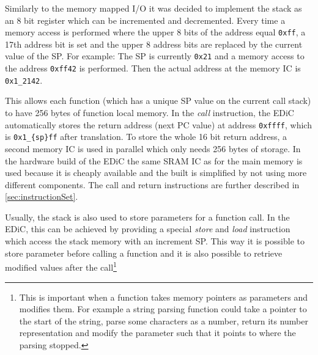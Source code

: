 Similarly to the memory mapped I/O it was decided to implement the stack as an 8 bit register which can be incremented and decremented.
Every time a memory access is performed where the upper 8 bits of the address equal \texttt{0xff}, a 17th address bit is set and the upper 8 address bits are replaced by the current value of the \gls{SP}.
For example: The \gls{SP}  is currently \texttt{0x21} and a memory access to the address \texttt{0xff42} is performed.
Then the actual address at the memory \gls{IC} is \texttt{0x1\_2142}.

This allows each function (which has a unique \gls{SP} value on the current call stack) to have 256 bytes of function local memory.
In the \emph{call} instruction, the \gls{EDiC} automatically stores the return address (next \gls{PC} value) at address \texttt{0xffff}, which is \texttt{0x1\_\{sp\}ff} after translation.
To store the whole 16 bit return address, a second memory \gls{IC} is used in parallel which only needs 256 bytes of storage.
In the hardware build of the \gls{EDiC} the same \gls{SRAM} \gls{IC} as for the main memory is used because it is cheaply available and the built is simplified by not using more different components.
The call and return instructions are further described in \cref{sec:instructionSet}.

Usually, the stack is also used to store parameters for a function call.
In the \gls{EDiC}, this can be achieved by providing a special \emph{store} and \emph{load} instruction which access the stack memory with an increment \gls{SP}.
This way it is possible to store parameter before calling a function and it is also possible to retrieve modified values after the call\footnote{This is important when a function takes memory pointers as parameters and modifies them. For example a string parsing function could take a pointer to the start of the string, parse some characters as a number, return its number representation and modify the parameter such that it points to where the parsing stopped.}
